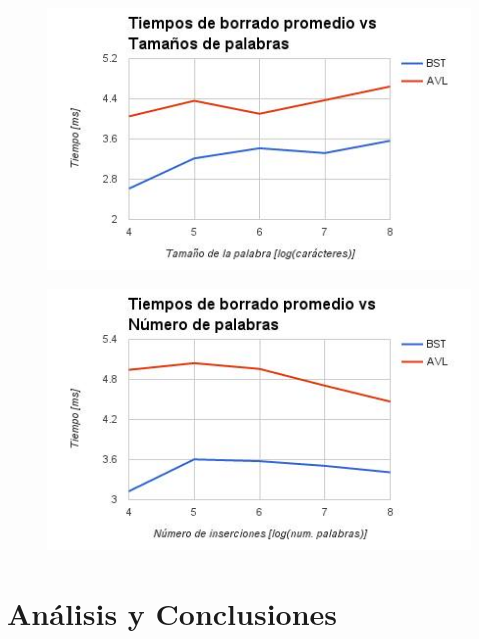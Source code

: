 \documentclass[12pt,letterpaper,hidelinks]{extarticle}
\begin{document}
\newpage

	\begin{figure}[ht!]
		\centering \includegraphics[scale=0.8]{img/del-size.jpg}
	\end{figure}

	\begin{figure}[ht!]
		\centering \includegraphics[scale=0.8]{img/del-num.jpg}
	\end{figure}

\newpage
\section{Análisis y Conclusiones}


%
%
%
\end{document}
